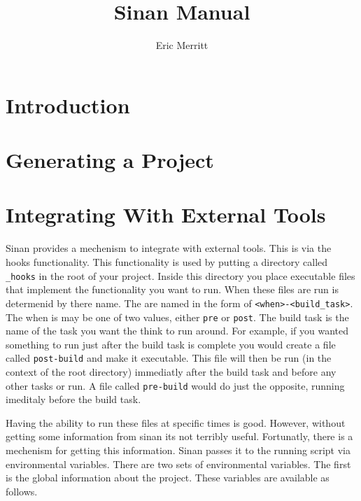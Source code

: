 \documentclass[11pt]{article}
\begin{document}
\title{Sinan Manual}
\author{Eric Merritt}
\maketitle
\tableofcontents
{}

\section {Introduction}
\section {Generating a Project}
\section {Integrating With External Tools}

Sinan provides a mechenism to integrate with external tools. This is
via the hooks functionality. This functionality is used by putting a
directory called \verb|_hooks| in the root of your project. Inside
this directory you place executable files that implement the
functionality you want to run. When these files are run is determenid
by there name. The are named in the form of
\verb|<when>-<build_task>|. The when is may be one of two values,
either \verb|pre| or \verb|post|. The build task is the name of the
task you want the think to run around. For example, if you wanted
something to run just after the build task is complete you would
create a file called \verb|post-build| and make it executable. This
file will then be run (in the context of the root directory)
immediatly after the build task and before any other tasks or run. A
file called \verb|pre-build| would do just the opposite, running
imeditaly before the build task.

Having the ability to run these files at specific times is
good. However, without getting some information from sinan its not
terribly useful. Fortunatly, there is a mechenism for getting this
information. Sinan passes it to the running script via environmental
variables. There are two sets of environmental variables. The first is
the global information about the project. These variables are
available as follows.
\end{document}
